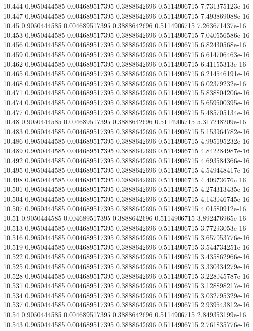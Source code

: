 {10.444 0.9050444585 0.004689517395 0.3888642696 0.5114906715 7.731375123e-16
10.447 0.9050444585 0.004689517395 0.3888642696 0.5114906715 7.493869088e-16
10.45 0.9050444585 0.004689517395 0.3888642696 0.5114906715 7.263671437e-16
10.453 0.9050444585 0.004689517395 0.3888642696 0.5114906715 7.040556586e-16
10.456 0.9050444585 0.004689517395 0.3888642696 0.5114906715 6.82430568e-16
10.459 0.9050444585 0.004689517395 0.3888642696 0.5114906715 6.614706463e-16
10.462 0.9050444585 0.004689517395 0.3888642696 0.5114906715 6.41155313e-16
10.465 0.9050444585 0.004689517395 0.3888642696 0.5114906715 6.214646191e-16
10.468 0.9050444585 0.004689517395 0.3888642696 0.5114906715 6.02379232e-16
10.471 0.9050444585 0.004689517395 0.3888642696 0.5114906715 5.838804206e-16
10.474 0.9050444585 0.004689517395 0.3888642696 0.5114906715 5.659500395e-16
10.477 0.9050444585 0.004689517395 0.3888642696 0.5114906715 5.485705134e-16
10.48 0.9050444585 0.004689517395 0.3888642696 0.5114906715 5.317248209e-16
10.483 0.9050444585 0.004689517395 0.3888642696 0.5114906715 5.153964782e-16
10.486 0.9050444585 0.004689517395 0.3888642696 0.5114906715 4.995695232e-16
10.489 0.9050444585 0.004689517395 0.3888642696 0.5114906715 4.842284987e-16
10.492 0.9050444585 0.004689517395 0.3888642696 0.5114906715 4.693584366e-16
10.495 0.9050444585 0.004689517395 0.3888642696 0.5114906715 4.549448417e-16
10.498 0.9050444585 0.004689517395 0.3888642696 0.5114906715 4.40973676e-16
10.501 0.9050444585 0.004689517395 0.3888642696 0.5114906715 4.274313435e-16
10.504 0.9050444585 0.004689517395 0.3888642696 0.5114906715 4.143046745e-16
10.507 0.9050444585 0.004689517395 0.3888642696 0.5114906715 4.01580912e-16
10.51 0.9050444585 0.004689517395 0.3888642696 0.5114906715 3.892476965e-16
10.513 0.9050444585 0.004689517395 0.3888642696 0.5114906715 3.77293053e-16
10.516 0.9050444585 0.004689517395 0.3888642696 0.5114906715 3.657053776e-16
10.519 0.9050444585 0.004689517395 0.3888642696 0.5114906715 3.544734251e-16
10.522 0.9050444585 0.004689517395 0.3888642696 0.5114906715 3.435862966e-16
10.525 0.9050444585 0.004689517395 0.3888642696 0.5114906715 3.330334279e-16
10.528 0.9050444585 0.004689517395 0.3888642696 0.5114906715 3.228045787e-16
10.531 0.9050444585 0.004689517395 0.3888642696 0.5114906715 3.128898217e-16
10.534 0.9050444585 0.004689517395 0.3888642696 0.5114906715 3.032795329e-16
10.537 0.9050444585 0.004689517395 0.3888642696 0.5114906715 2.939643812e-16
10.54 0.9050444585 0.004689517395 0.3888642696 0.5114906715 2.849353199e-16
10.543 0.9050444585 0.004689517395 0.3888642696 0.5114906715 2.761835776e-16
}

